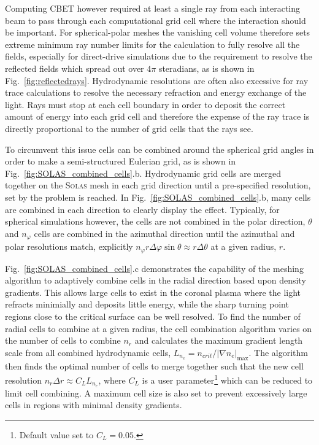 Computing \ac{CBET} however required at least a single ray from each interacting beam to pass through each computational grid cell where the interaction should be important.
For spherical-polar meshes the vanishing cell volume therefore sets extreme minimum ray number limits for the calculation to fully resolve all the fields, especially for direct-drive simulations due to the requirement to resolve the reflected fields which spread out over $4\pi$ steradians, as is shown in Fig.~\ref{fig:reflectedrays}.
Hydrodynamic resolutions are often also excessive for ray trace calculations to resolve the necessary refraction and energy exchange of the light.
Rays must stop at each cell boundary in order to deposit the correct amount of energy into each grid cell and therefore the expense of the ray trace is directly proportional to the number of grid cells that the rays see.

To circumvent this issue cells can be combined around the spherical grid angles in order to make a semi-structured Eulerian grid, as is shown in Fig.~\ref{fig:SOLAS_combined_cells}.b.
Hydrodynamic grid cells are merged together on the \textsc{Solas} mesh in each grid direction until a pre-specified resolution, set by the problem is reached.
In Fig.~\ref{fig:SOLAS_combined_cells}.b, many cells are combined in each direction to clearly display the effect.
Typically, for spherical simulations however, the cells are not combined in the polar direction, $\theta$ and $n_{\varphi}$ cells are combined in the azimuthal direction until the azimuthal and polar resolutions match, explicitly $n_{\varphi}r\Delta\varphi\sin\theta \approx r \Delta\theta$ at a given radius, $r$.

Fig.~\ref{fig:SOLAS_combined_cells}.c demonstrates the capability of the meshing algorithm to adaptively combine cells in the radial direction based upon density gradients.
This allows large cells to exist in the coronal plasma where the light refracts minimially and deposits little energy, while the sharp turning point regions close to the critical surface can be well resolved.
To find the number of radial cells to combine at a given radius, the cell combination algorithm varies on the number of cells to combine $n_r$ and calculates the maximum gradient length scale from all combined hydrodynamic cells, $L_{n_e}=n_{crit}/|\nabla n_e|_{\max}$.
The algorithm then finds the optimal number of cells to merge together such that the new cell resolution $n_r\Delta r \approx C_L L_{n_e}$, where $C_L$ is a user parameter\footnote{Default value set to $C_L=0.05$.} which can be reduced to limit cell combining.
A maximum cell size is also set to prevent excessively large cells in regions with minimal density gradients.


